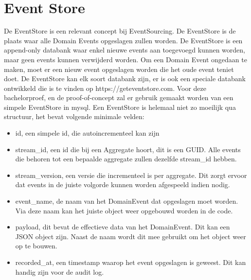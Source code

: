 
\section{Event Store}
\label{sec:event-store}

De EventStore is een relevant concept bij EventSourcing. De EventStore is de plaats waar alle Domain Events opgeslagen zullen worden. De EventStore is een append-only databank waar enkel nieuwe events aan toegevoegd kunnen worden, maar geen events kunnen verwijderd worden. Om een Domain Event ongedaan te maken, moet er een nieuw event opgeslagen worden die het oude event teniet doet. De EventStore kan elk soort databank zijn, er is ook een speciale databank ontwikkeld die is te vinden op https://geteventstore.com. Voor deze bachelorproef, en de proof-of-concept zal er gebruik gemaakt worden van een simpele EventStore in \gls{mysql}. Een EventStore is helemaal niet zo moeilijk qua structuur, het bevat volgende minimale velden:

\begin{itemize}
  \item{id, een simpele id, die autoincrementeel kan zijn}
  \item{stream_id, een id die bij een Aggregate hoort, dit is een \gls{GUID}. Alle events die behoren tot een bepaalde aggregate zullen dezelfde stream_id hebben.}
  \item{stream_version, een versie die incrementeel is per aggregate. Dit zorgt ervoor dat events in de juiste volgorde kunnen worden afgespeeld indien nodig.}
  \item{event_name, de naam van het DomainEvent dat opgeslagen moet worden. Via deze naam kan het juiste object weer opgebouwd worden in de code.}
  \item{payload, dit bevat de effectieve data van het DomainEvent. Dit kan een \gls{JSON} object zijn. Naast de naam wordt dit mee gebruikt om het object weer op te bouwen.}
  \item{recorded_at, een timestamp waarop het event opgeslagen is geweest. Dit kan handig zijn voor de audit log.}
\end{itemize}
